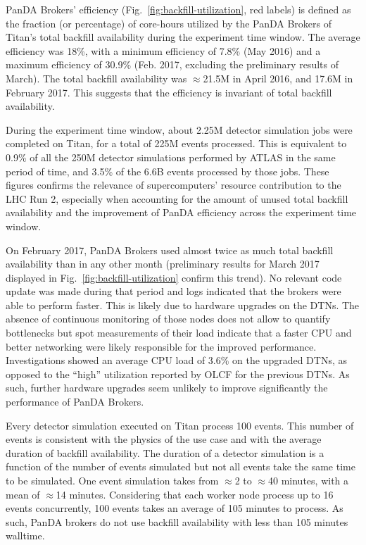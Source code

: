 PanDA Brokers' efficiency (Fig.~\ref{fig:backfill-utilization}, red labels)
is defined as the fraction (or percentage) of core-hours utilized by the
PanDA Brokers of Titan’s total backfill availability during the experiment
time window. The  average efficiency was 18\%, with a minimum efficiency of
7.8\% (May 2016) and a maximum efficiency of 30.9\% (Feb. 2017, excluding the
preliminary results of March). The total backfill availability was
\(\approx\)21.5M in April 2016, and 17.6M in February 2017. This suggests
that the efficiency is invariant of total backfill availability.

During the experiment time window, about 2.25M detector simulation jobs were
completed on Titan, for a total of 225M events processed. This is equivalent
to 0.9\% of all the 250M detector simulations performed by ATLAS in the same
period of time, and 3.5\% of the 6.6B events processed by those jobs. These
figures confirms the relevance of supercomputers' resource contribution to
the LHC Run 2, especially when accounting for the amount of unused total
backfill availability and the improvement of PanDA efficiency across the
experiment time window.

On February 2017, PanDA Brokers used almost twice as much total backfill
availability than in any other month (preliminary results for March 2017
displayed in Fig.~\ref{fig:backfill-utilization} confirm this trend). No
relevant code update was made during that period and logs indicated that the
brokers were able to perform faster. This is likely due to hardware upgrades
on the DTNs. The absence of continuous monitoring of those nodes does not
allow to quantify bottlenecks but spot measurements of their load indicate
that a faster CPU and better networking were likely responsible for the
improved performance. Investigations showed an average CPU load of 3.6\% on
the upgraded DTNs, as opposed to the ``high'' utilization reported by OLCF
for the previous DTNs. As such, further hardware upgrades seem unlikely to
improve significantly the performance of PanDA Brokers.

Every detector simulation executed on Titan process 100 events. This number
of events is consistent with the physics of the use case and with the average
duration of backfill availability. The duration of a detector simulation is a
function of the number of events simulated but not all events take the same
time to be simulated. One event simulation takes from \(\approx\)2 to
\(\approx\)40 minutes, with a mean of \(\approx\)14 minutes. Considering that
each worker node process up to 16 events concurrently, 100 events takes an
average of 105 minutes to process. As such, PanDA brokers do not use backfill
availability with less than 105 minutes walltime.


